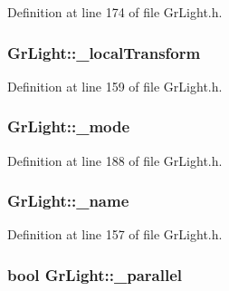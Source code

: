Definition at line 174 of file GrLight.h.\hypertarget{class_gr_light_2a3bceb8640e0c14c1193b7e9e0f5dfb}{
\subsubsection[{\_\-localTransform}]{ {\bf GrLight::\_\-localTransform}}}
\label{class_gr_light_2a3bceb8640e0c14c1193b7e9e0f5dfb}




Definition at line 159 of file GrLight.h.\hypertarget{class_gr_light_e99e12ad16003bec82de9a31eb859d5d}{
\subsubsection[{\_\-mode}]{ {\bf GrLight::\_\-mode}}}
\label{class_gr_light_e99e12ad16003bec82de9a31eb859d5d}




Definition at line 188 of file GrLight.h.\hypertarget{class_gr_light_91326c4911f07bf038ba37567ee2d45a}{
\subsubsection[{\_\-name}]{ {\bf GrLight::\_\-name}}}
\label{class_gr_light_91326c4911f07bf038ba37567ee2d45a}




Definition at line 157 of file GrLight.h.\hypertarget{class_gr_light_e8e076faf998d07720755a05537af503}{
\subsubsection[{\_\-parallel}]{\setlength{\rightskip}{0pt plus 5cm}bool {\bf GrLight::\_\-parallel}}}
\label{class_gr_light_e8e076faf998d07720755a05537af503}




